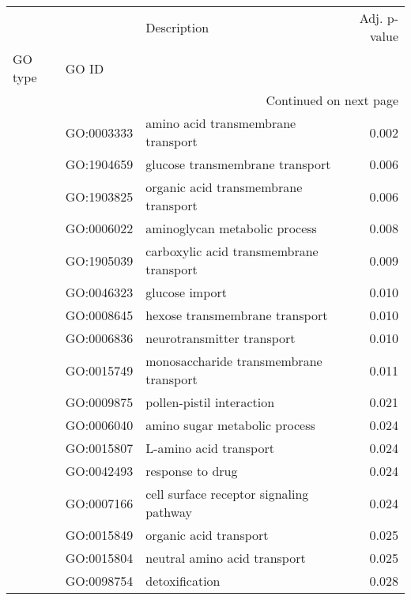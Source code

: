 \begin{longtable}{lllr}
\toprule
   &            &                                  Description &  Adj. p-value \\
GO type & GO ID &                                              &               \\
\midrule
\endhead
\midrule
\multicolumn{4}{r}{{Continued on next page}} \\
\midrule
\endfoot

\bottomrule
\endlastfoot
\multirow{53}{*}{BP} & GO:0003333 &           amino acid transmembrane transport &         0.002 \\
   & GO:1904659 &              glucose transmembrane transport &         0.006 \\
   & GO:1903825 &         organic acid transmembrane transport &         0.006 \\
   & GO:0006022 &                aminoglycan metabolic process &         0.008 \\
   & GO:1905039 &      carboxylic acid transmembrane transport &         0.009 \\
   & GO:0046323 &                               glucose import &         0.010 \\
   & GO:0008645 &               hexose transmembrane transport &         0.010 \\
   & GO:0006836 &                   neurotransmitter transport &         0.010 \\
   & GO:0015749 &       monosaccharide transmembrane transport &         0.011 \\
   & GO:0009875 &                    pollen-pistil interaction &         0.021 \\
   & GO:0006040 &                amino sugar metabolic process &         0.024 \\
   & GO:0015807 &                       L-amino acid transport &         0.024 \\
   & GO:0042493 &                             response to drug &         0.024 \\
   & GO:0007166 &      cell surface receptor signaling pathway &         0.024 \\
   & GO:0015849 &                       organic acid transport &         0.025 \\
   & GO:0015804 &                 neutral amino acid transport &         0.025 \\
   & GO:0098754 &                               detoxification &         0.028 \\

\end{longtable}
